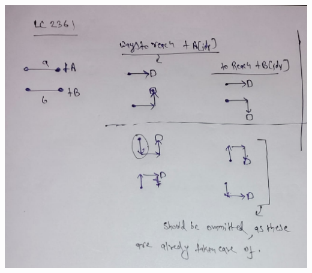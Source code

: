 \begin{exerciseHints}
\begin{enumerate}
        \includegraphics[width=\marginparwidth]{resources/LC2361.jpg}
        
    \end{enumerate}
    
\end{exerciseHints}